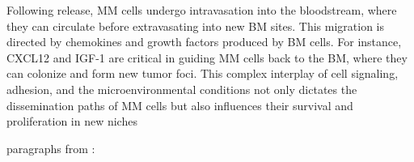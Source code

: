 Following release, MM cells undergo intravasation into the bloodstream, where
they can circulate before extravasating into new BM sites. This migration is
directed by chemokines and growth factors produced by BM cells. For instance,
CXCL12 and IGF-1 are critical in guiding MM cells back to the BM, where they can
colonize and form new tumor foci. This complex interplay of cell signaling,
adhesion, and the microenvironmental conditions not only dictates the
dissemination paths of MM cells but also influences their survival and
proliferation in new niches \cite{zeissigTumourDisseminationMultiple2020}


paragraphs from \cite{zeissigTumourDisseminationMultiple2020}:


